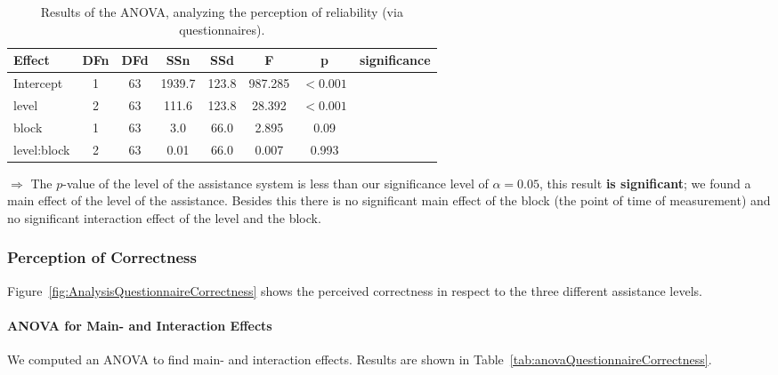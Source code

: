 		\begin{table}[H]\centering
			\caption{Results of the \ac{ANOVA}, analyzing the perception of reliability (via questionnaires).}
			\begin{tabular}{lccccccc}
				\toprule
				Effect & DFn & DFd & SSn & SSd & F & p & significance \\
				\midrule
				Intercept 	& 1 & 63 & 1939.7 & 123.8 & 987.285 & \(< 0.001\) & \Checkmark \\
				level				& 2 & 63 & 111.6 & 123.8 & 28.392  & \(< 0.001\) & \Checkmark \\
				block 			& 1 & 63 & 3.0  & 66.0 & 2.895  & 0.09 & \XSolidBrush \\
				level:block & 2 & 63 & 0.01 & 66.0 & 0.007 	& 0.993 & \XSolidBrush \\
				\bottomrule
			\end{tabular}
			\label{tab:anovaReliability}
		\end{table}
		\(\Rightarrow\) The \(p\)-value of the level of the assistance system is less than our significance level of \(\alpha = 0.05\), this result \textbf{is significant}; we found a main effect of the level of the assistance. Besides this there is no significant main effect of the block (the point of time of measurement) and no significant interaction effect of the level and the block.



	\subsubsection{Perception of Correctness}
		Figure~\ref{fig:AnalysisQuestionnaireCorrectness} shows the perceived correctness in respect to the three different assistance levels.


		\paragraph{\ac{ANOVA} for Main- and Interaction Effects}
		We computed an \ac{ANOVA} to find main- and interaction effects. Results are shown in Table~\ref{tab:anovaQuestionnaireCorrectness}.

